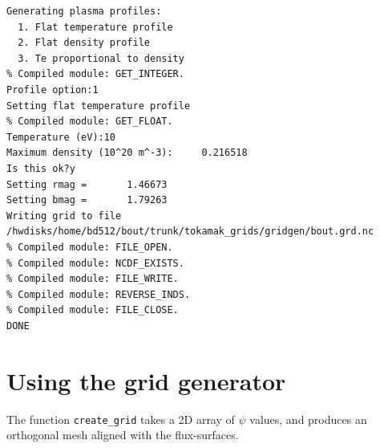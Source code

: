 \documentclass[12pt, a4paper]{article}
\newcommand{\code}[1]{\texttt{#1}}
\begin{document}
\clearpage

\begin{verbatim}
Generating plasma profiles:
  1. Flat temperature profile
  2. Flat density profile
  3. Te proportional to density
% Compiled module: GET_INTEGER.
Profile option:1
Setting flat temperature profile
% Compiled module: GET_FLOAT.
Temperature (eV):10
Maximum density (10^20 m^-3):     0.216518
Is this ok?y
Setting rmag =       1.46673
Setting bmag =       1.79263
Writing grid to file /hwdisks/home/bd512/bout/trunk/tokamak_grids/gridgen/bout.grd.nc
% Compiled module: FILE_OPEN.
% Compiled module: NCDF_EXISTS.
% Compiled module: FILE_WRITE.
% Compiled module: REVERSE_INDS.
% Compiled module: FILE_CLOSE.
DONE
\end{verbatim}

\section{Using the grid generator}

The function \code{create\_grid} takes a 2D array of $\psi$ values, and 
produces an orthogonal mesh aligned with the flux-surfaces.
\end{document}
